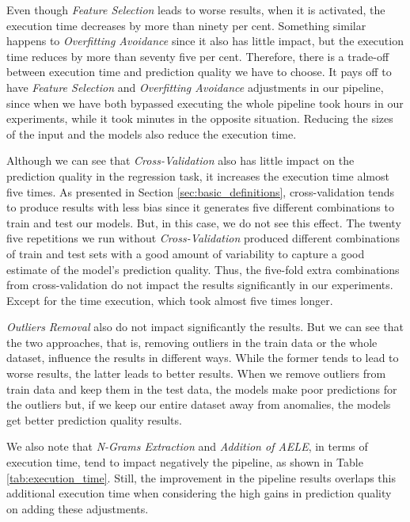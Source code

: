 Even though \textit{Feature Selection} leads to worse results, when it is activated, the execution time decreases by more than ninety per cent. Something similar happens to \textit{Overfitting Avoidance} since it also has little impact, but the execution time reduces by more than seventy five per cent. Therefore, there is a trade-off between execution time and prediction quality we have to choose. It pays off to have \textit{Feature Selection} and \textit{Overfitting Avoidance} adjustments in our pipeline, since when we have both bypassed executing the whole pipeline took hours in our experiments, while it took minutes in the opposite situation. Reducing the sizes of the input and the models also reduce the execution time.

Although we can see that \textit{Cross-Validation} also has little impact on the prediction quality in the regression task, it increases the execution time almost five times. As presented in Section \ref{sec:basic_definitions}, cross-validation tends to produce results with less bias since it generates five different combinations to train and test our models. But, in this case, we do not see this effect. The twenty five repetitions we run without \textit{Cross-Validation} produced different combinations of train and test sets with a good amount of variability to capture a good estimate of the model's prediction quality. Thus, the five-fold extra combinations from cross-validation do not impact the results significantly in our experiments. Except for the time execution, which took almost five times longer.

\textit{Outliers Removal} also do not impact significantly the results. But we can see that the two approaches, that is, removing outliers in the train data or the whole dataset, influence the results in different ways. While the former tends to lead to worse results, the latter leads to better results. When we remove outliers from train data and keep them in the test data, the models make poor predictions for the outliers but, if we keep our entire dataset away from anomalies, the models get better prediction quality results.

We also note that \textit{N-Grams Extraction} and \textit{Addition of \gls{AELE}}, in terms of execution time, tend to impact negatively the pipeline, as shown in Table \ref{tab:execution_time}. Still, the improvement in the pipeline results overlaps this additional execution time when considering the high gains in prediction quality on adding these adjustments.


